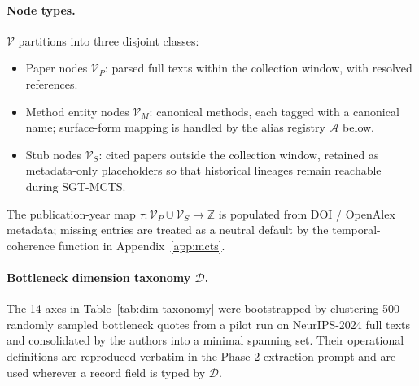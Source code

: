 \documentclass{opendatalab}
\begin{document}
\paragraph{Node types.}
$\mathcal{V}$ partitions into three disjoint classes:
\begin{itemize}
\item Paper nodes $\mathcal{V}_P$: parsed full texts within the collection window, with resolved references.
\item Method entity nodes $\mathcal{V}_M$: canonical methods, each tagged with a canonical name; surface-form
mapping is handled by the alias registry $\mathcal{A}$ below.
\item Stub nodes $\mathcal{V}_S$: cited papers outside the collection window, retained as metadata-only placeholders
so that historical lineages remain reachable during SGT-MCTS.
\end{itemize}
The publication-year map $\tau:\mathcal{V}_P\cup\mathcal{V}_S\to\mathbb{Z}$ is populated from DOI / OpenAlex
metadata; missing entries are treated as a neutral default by the temporal-coherence function in Appendix~\ref{app:mcts}.

\paragraph{Bottleneck dimension taxonomy $\mathcal{D}$.}
The 14 axes in Table~\ref{tab:dim-taxonomy} were bootstrapped by clustering 500 randomly sampled bottleneck quotes
from a pilot run on NeurIPS-2024 full texts and consolidated by the authors into a minimal spanning set. Their
operational definitions are reproduced verbatim in the Phase-2 extraction prompt and are used wherever a record
field is typed by $\mathcal{D}$.
\end{document}
